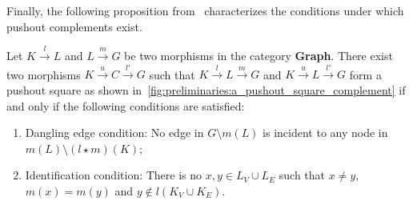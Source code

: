 Finally, the following proposition from~\cite{corradini1997algebraic} characterizes the conditions under which pushout complements exist.
\begin{proposition} 
    \label{prop:existence_of_pushout_complement}
    Let $K \overset{l}{\rightarrow} L$ and $L \overset{m}{\rightarrow} G$ be two morphisms in the category \textbf{Graph}. There exist two morphisms $K \overset{u}{\rightarrow} C \overset{l'}{\rightarrow} G$ such that $K \overset{l}{\rightarrow} L \overset{m}{\rightarrow} G$ and $K \overset{u}{\rightarrow} L \overset{l'}{\rightarrow} G$ form a pushout square as shown in~\autoref{fig:preliminaries:a_pushout_square_complement} if and only if the following conditions are satisfied:
    \begin{enumerate} 
        \item{Dangling edge condition:} 
        No edge in \(G\setminus m(L)\) is incident to any node in \(m(L) \setminus (l \star m)(K)\);
        \item{Identification condition: } There is no $x,y \in L_V \cup L_E$ such that $x \neq y$, $m(x) = m(y)$ and $y \notin l(K_V \cup K_E)$.
    \end{enumerate} 
    \begin{figure}[H]
        \centering
        \caption{}
        \label{fig:preliminaries:a_pushout_square_complement}
    \end{figure}
\end{proposition}
 


